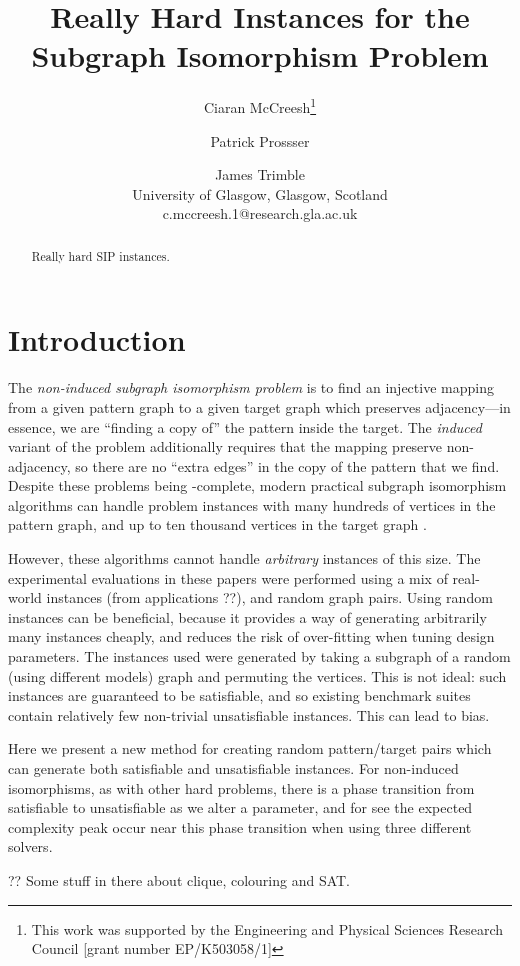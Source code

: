 \documentclass[letterpaper]{article}
\title{Really Hard Instances for the Subgraph Isomorphism Problem}
\author{Ciaran McCreesh\thanks{This work was supported by the Engineering and Physical Sciences
    Research Council [grant number EP/K503058/1]} \and Patrick Prossser \and James Trimble \\
University of Glasgow, Glasgow, Scotland \\
c.mccreesh.1@research.gla.ac.uk}
\begin{document}
\maketitle

\begin{abstract}
    Really hard SIP instances.
\end{abstract}

\section{Introduction}

The \emph{non-induced subgraph isomorphism problem} is to find an injective mapping from a given
pattern graph to a given target graph which preserves adjacency---in essence, we are ``finding a
copy of'' the pattern inside the target. The \emph{induced} variant of the problem additionally
requires that the mapping preserve non-adjacency, so there are no ``extra edges'' in the copy of the
pattern that we find. Despite these problems being \NP-complete, modern practical subgraph
isomorphism algorithms can handle problem instances with many hundreds of vertices in the pattern
graph, and up to ten thousand vertices in the target graph
\cite{Cordella:2004,Solnon:2010,Audemard:2014,McCreesh:2015}.

However, these algorithms cannot handle \emph{arbitrary} instances of this size. The experimental
evaluations in these papers were performed using a mix of real-world instances (from applications
??), and random graph pairs.  Using random instances can be beneficial, because it provides a way of
generating arbitrarily many instances cheaply, and reduces the risk of over-fitting when tuning
design parameters. The instances used were generated by taking a subgraph of a random (using
different models) graph and permuting the vertices.  This is not ideal: such instances are
guaranteed to be satisfiable, and so existing benchmark suites contain relatively few non-trivial
unsatisfiable instances. This can lead to bias.

Here we present a new method for creating random pattern/target pairs which can generate both
satisfiable and unsatisfiable instances. For non-induced isomorphisms, as with other hard problems,
there is a phase transition from satisfiable to unsatisfiable as we alter a parameter, and for see
the expected complexity peak occur near this phase transition when using three different solvers.

?? Some stuff in there about clique, colouring and SAT.
\end{document}
